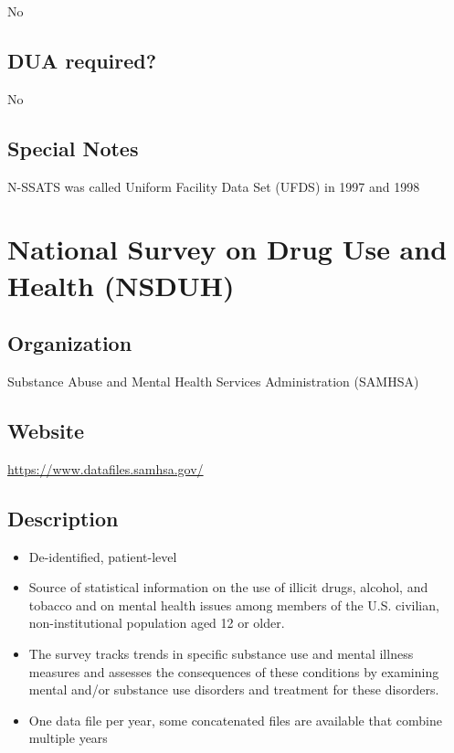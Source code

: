 \documentclass[
]{book}
\providecommand{\tightlist}{%
  \setlength{\itemsep}{0pt}\setlength{\parskip}{0pt}}
\begin{document}
No

\hypertarget{dua-required-63}{%
\section{DUA required?}\label{dua-required-63}}

No

\hypertarget{special-notes-63}{%
\section{Special Notes}\label{special-notes-63}}

N-SSATS was called Uniform Facility Data Set (UFDS) in 1997 and 1998

\mainmatter

\hypertarget{national-survey-on-drug-use-and-health-nsduh}{%
\chapter{National Survey on Drug Use and Health (NSDUH)}\label{national-survey-on-drug-use-and-health-nsduh}}

\hypertarget{organization-64}{%
\section{Organization}\label{organization-64}}

Substance Abuse and Mental Health Services Administration (SAMHSA)

\hypertarget{website-64}{%
\section{Website}\label{website-64}}

\url{https://www.datafiles.samhsa.gov/}

\hypertarget{description-64}{%
\section{Description}\label{description-64}}

\begin{itemize}
\tightlist
\item
  De-identified, patient-level
\item
  Source of statistical information on the use of illicit drugs, alcohol, and tobacco and on mental health issues among members of the U.S. civilian, non-institutional population aged 12 or older.
\item
  The survey tracks trends in specific substance use and mental illness measures and assesses the consequences of these conditions by examining mental and/or substance use disorders and treatment for these disorders.
\item
  One data file per year, some concatenated files are available that combine multiple years
\end{itemize}
\end{document}
